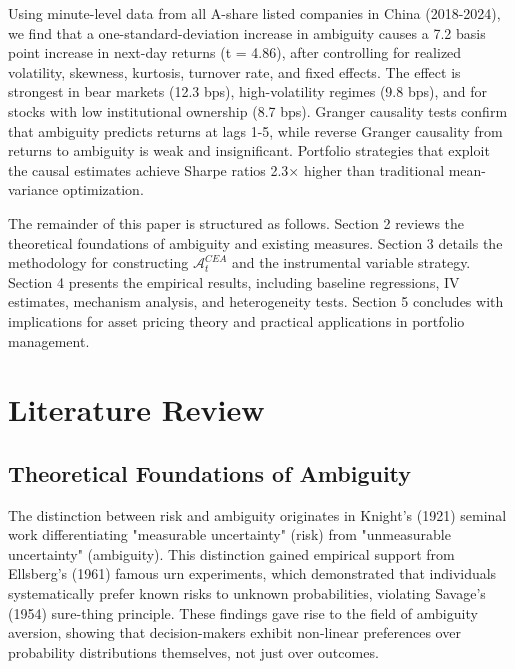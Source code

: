 \documentclass[preprint,12pt,authoryear]{elsarticle}
\begin{document}
Using minute-level data from all A-share listed companies in China (2018-2024), we find that a one-standard-deviation increase in ambiguity causes a 7.2 basis point increase in next-day returns (t = 4.86), after controlling for realized volatility, skewness, kurtosis, turnover rate, and fixed effects. The effect is strongest in bear markets (12.3 bps), high-volatility regimes (9.8 bps), and for stocks with low institutional ownership (8.7 bps). Granger causality tests confirm that ambiguity predicts returns at lags 1-5, while reverse Granger causality from returns to ambiguity is weak and insignificant. Portfolio strategies that exploit the causal estimates achieve Sharpe ratios 2.3× higher than traditional mean-variance optimization.

The remainder of this paper is structured as follows. Section 2 reviews the theoretical foundations of ambiguity and existing measures. Section 3 details the methodology for constructing $\mathcal{A}^{CEA}_t$ and the instrumental variable strategy. Section 4 presents the empirical results, including baseline regressions, IV estimates, mechanism analysis, and heterogeneity tests. Section 5 concludes with implications for asset pricing theory and practical applications in portfolio management.

\section{Literature Review}

\subsection{Theoretical Foundations of Ambiguity}

The distinction between risk and ambiguity originates in Knight's (1921) seminal work differentiating "measurable uncertainty" (risk) from "unmeasurable uncertainty" (ambiguity). This distinction gained empirical support from Ellsberg's (1961) famous urn experiments, which demonstrated that individuals systematically prefer known risks to unknown probabilities, violating Savage's (1954) sure-thing principle. These findings gave rise to the field of ambiguity aversion, showing that decision-makers exhibit non-linear preferences over probability distributions themselves, not just over outcomes.
\end{document}
